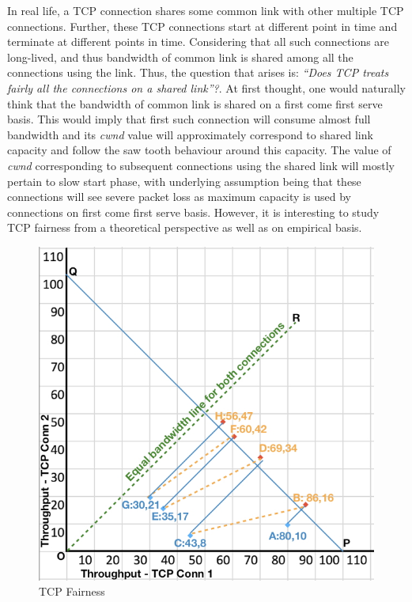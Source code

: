 \begin{multicols}{2}
In real life, a TCP connection shares  some common link with other multiple TCP connections. Further, these TCP connections start at different point in time and terminate at different points in time.  Considering that all such connections are long-lived, and thus bandwidth of common link is shared among all the connections using the link. Thus, the question that arises is: \textit{“Does TCP treats fairly all the connections on a shared link”?}. At first thought, one would naturally think that the bandwidth of common link is shared on a first come first serve basis. This would imply that first such connection will consume almost full bandwidth and its \textit{cwnd} value will approximately correspond to shared link capacity and follow the saw tooth behaviour around this capacity. The value of \textit{cwnd} corresponding to subsequent connections using the shared link will mostly pertain to slow start phase, with underlying assumption being that these connections will see severe packet loss as maximum capacity is used by connections on first come first serve basis. However, it is interesting to study TCP fairness from a theoretical perspective as well as on empirical basis.

\begin{figure}[H]
\centering
\includegraphics[scale=1.2]{src/Figures/chap2/chap2-fig06.jpg}
\caption{TCP Fairness}\label{chap2-fig06}
\end{figure}


\end{multicols}

